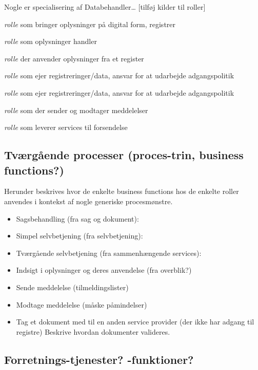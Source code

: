 Nogle er specialisering af Databehandler\ldots{} {[}tilføj kilder til
roller{]}

\begin{description}
\tightlist
\item[Registrant]
\emph{rolle} som bringer oplysninger på digital form, registrer
\item[Datasubject]
\emph{rolle} som oplysninger handler
\item[Dataanvender]
\emph{rolle} der anvender oplysninger fra et register
\item[Dataejer]
\emph{rolle} som ejer registreringer/data, ansvar for at udarbejde
adgangspolitik
\item[Datadistributør]
\emph{rolle} som ejer registreringer/data, ansvar for at udarbejde
adgangspolitik
\item[Messaging User]
\emph{rolle} som der sender og modtager meddelelser
\item[Messaging Provider]
\emph{rolle} som leverer services til forsendelse
\end{description}

\subsection{Tværgående processer (proces-trin, business
functions?)}\label{tvuxe6rguxe5ende-processer-proces-trin-business-functions}

Herunder beskrives hvor de enkelte business functions hos de enkelte
roller anvendes i kontekst af nogle generiske procesmønstre.

\begin{itemize}
\tightlist
\item
  Sagsbehandling (fra sag og dokument):
\item
  Simpel selvbetjening (fra selvbetjening):
\item
  Tværgående selvbetjening (fra sammenhængende services):
\item
  Indsigt i oplysninger og deres anvendelse (fra overblik?)
\item
  Sende meddelelse (tilmeldingslister)
\item
  Modtage meddelelse (måske påmindelser)
\item
  Tag et dokument med til en anden service provider (der ikke har adgang
  til registre) Beskrive hvordan dokumenter valideres.
\end{itemize}

\subsection{Forretnings-tjenester?
-funktioner?}\label{forretnings-tjenester--funktioner}

